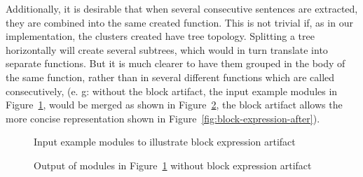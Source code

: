 Additionally, it is desirable that when several consecutive sentences
are extracted, they are combined into the same created function. This
is not trivial if, as in our implementation, the clusters created
have tree topology. Splitting a tree horizontally will create several
subtrees, which would in turn translate into separate functions. But
it is much clearer to have them grouped in the body of the same function,
rather than in several different functions which are called consecutively,
(e. g: without the block artifact, the input example modules in Figure~\ref{fig:block-expression-input},
would be merged as shown in Figure~\ref{fig:block-expression-before},
the block artifact allows the more concise representation shown in
Figure~\ref{fig:block-expression-after}).

\begin{figure}
\begin{minipage}[t]{0.5\columnwidth}%
%
\end{minipage}%
\begin{minipage}[t]{0.5\columnwidth}%
%
\end{minipage}

\caption{Input example modules to illustrate block expression artifact\label{fig:block-expression-input}}


\end{figure}


\begin{figure}
\begin{minipage}[t]{0.5\columnwidth}%
%
\end{minipage}%
\begin{minipage}[t]{0.5\columnwidth}%
%
\end{minipage}

\begin{minipage}[t]{1\columnwidth}%
%
\end{minipage}

\caption{Output of modules in Figure~\ref{fig:block-expression-input} without
block expression artifact\label{fig:block-expression-before}}
\end{figure}



